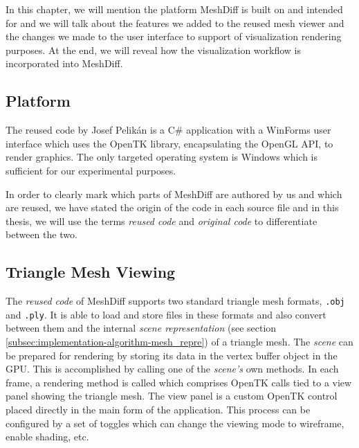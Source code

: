 In this chapter, we will mention the platform MeshDiff is built on and intended for and we will talk about the features we added to the reused mesh viewer and the changes we made to the user interface to support of visualization rendering purposes. At the end, we will reveal how the visualization workflow is incorporated into MeshDiff.

\subsection{Platform}
\label{subsec:implementation-architecture-platform}

The reused code by Josef Pelikán is a C\# application with a WinForms user interface which uses the OpenTK library, encapsulating the OpenGL API, to render graphics. The only targeted operating system is Windows which is sufficient for our experimental purposes.

In order to clearly mark which parts of MeshDiff are authored by us and which are reused, we have stated the origin of the code in each source file and in this thesis, we will use the terms {\it reused code} and {\it original code} to differentiate between the two.

\subsection{Triangle Mesh Viewing}
\label{subsec:implementation-architecture-mesh_viewing}

The {\it reused code} of MeshDiff supports two standard triangle mesh formats, \verb+.obj+ and \verb+.ply+. It is able to load and store files in these formats and also convert between them and the internal {\it scene representation} (see section \ref{subsec:implementation-algorithm-mesh_repre}) of a triangle mesh. The {\it scene} can be prepared for rendering by storing its data in the vertex buffer object in the GPU. This is accomplished by calling one of the {\it scene's} own methods. In each frame, a rendering method is called which comprises OpenTK calls tied to a view panel showing the triangle mesh. The view panel is a custom OpenTK control placed directly in the main form of the application. This process can be configured by a set of toggles which can change the viewing mode to wireframe, enable shading, etc.

